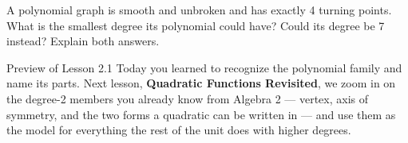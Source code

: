 \documentclass[10pt]{article}
\begin{document}
\vspace{0.1in}

\boxguard
\begin{extensionbox}
A polynomial graph is smooth and unbroken and has exactly 4 turning points. What is
the smallest degree its polynomial could have? Could its degree be 7 instead?
Explain both answers.

\vspace{0.05in}
\end{extensionbox}

\vspace{0.1in}

\boxguard
\begin{notesbox}{Preview of Lesson 2.1}
Today you learned to recognize the polynomial family and name its parts. Next
lesson, \textbf{Quadratic Functions Revisited}, we zoom in on the degree-2 members
you already know from Algebra 2 --- vertex, axis of symmetry, and the two forms a
quadratic can be written in --- and use them as the model for everything the rest
of the unit does with higher degrees.
\end{notesbox}
\end{document}
